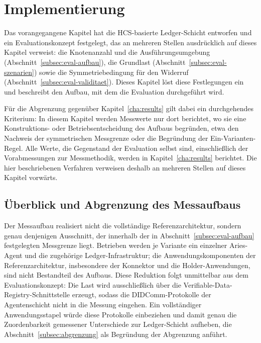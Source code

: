 \chapter{Implementierung}
\label{cha:implementierung}

Das vorangegangene Kapitel hat die HCS-basierte Ledger-Schicht entworfen und ein Evaluationskonzept festgelegt, das an mehreren Stellen ausdrücklich auf dieses Kapitel verweist: die Knotenanzahl und die Ausführungsumgebung (Abschnitt~\ref{subsec:eval-aufbau}), die Grundlast (Abschnitt~\ref{subsec:eval-szenarien}) sowie die Symmetriebedingung für den Widerruf (Abschnitt~\ref{subsec:eval-validitaet}). Dieses Kapitel löst diese Festlegungen ein und beschreibt den Aufbau, mit dem die Evaluation durchgeführt wird.

Für die Abgrenzung gegenüber Kapitel~\ref{cha:results} gilt dabei ein durchgehendes Kriterium: In diesem Kapitel werden Messwerte nur dort berichtet, wo sie eine Konstruktions- oder Betriebsentscheidung des Aufbaus begründen, etwa den Nachweis der symmetrischen Messgrenze oder die Begründung der Ein-Varianten-Regel. Alle Werte, die Gegenstand der Evaluation selbst sind, einschließlich der Vorabmessungen zur Messmethodik, werden in Kapitel~\ref{cha:results} berichtet. Die hier beschriebenen Verfahren verweisen deshalb an mehreren Stellen auf dieses Kapitel vorwärts.


\section{Überblick und Abgrenzung des Messaufbaus}
\label{sec:impl-ueberblick}

Der Messaufbau realisiert nicht die vollständige Referenzarchitektur, sondern genau denjenigen Ausschnitt, der innerhalb der in Abschnitt~\ref{subsec:eval-aufbau} festgelegten Messgrenze liegt. Betrieben werden je Variante ein einzelner Aries-Agent und die zugehörige Ledger-Infrastruktur; die Anwendungskomponenten der Referenzarchitektur, insbesondere der Konnektor und die Holder-Anwendungen, sind nicht Bestandteil des Aufbaus. Diese Reduktion folgt unmittelbar aus dem Evaluationskonzept: Die Last wird ausschließlich über die Verifiable-Data-Registry-Schnittstelle erzeugt, sodass die DIDComm-Protokolle der Agentenschicht nicht in die Messung eingehen. Ein vollständiger Anwendungsstapel würde diese Protokolle einbeziehen und damit genau die Zuordenbarkeit gemessener Unterschiede zur Ledger-Schicht aufheben, die Abschnitt~\ref{subsec:abgrenzung} als Begründung der Abgrenzung anführt.

